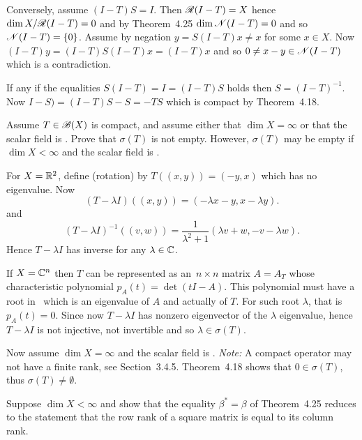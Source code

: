 \begin{enumerate}
\begin{itemize}
Conversely, assume \((I - T)S = I\).
Then \(\mathscr{R}(I - T) = X\) 
hence \(\dim X / \mathscr{R}(I - T) = 0\)
and by Theorem~4.25 \(\dim \mathscr{N}(I -T) = 0\) 
and so \(\mathscr{N}(I -T) = \{0\}\).
Assume by negation \(y = S(I - T)x \neq x\) for some \(x\in X\).
Now \((I - T)y = (I - T)S(I - T)x = (I - T)x\) and so 
\(0 \neq x - y \in \mathscr{N}(I - T)\) which is a contradiction.

If any if the equalities \(S(I - T) = I = (I - T)S\) holds
then \(S = (I - T)^{-1}\). 
Now \(I - S) = (I - T)S - S = -TS\) which is compact by Theorem~4.18.
\end{itemize}

\begin{excopy}
Assume \(T \in \mathscr{B}(X)\) is compact, and assume either that \(\dim X = \infty\)
or that the scalar
field is \C. Prove that \(\sigma(T)\) is not empty. However, \(\sigma(T)\)
 may be empty if \(\dim X < \infty\)
and the scalar field is \R.
\end{excopy}

For \(X = \mathbb{R}^2\), define (rotation) by \(T((x,y)) = (-y, x)\) which has
no eigenvalue. Now 
\begin{equation*}
(T - \lambda I)((x,y)) = (-\lambda x - y, x -\lambda y).
\end{equation*}
and
\begin{equation*}
(T - \lambda I)^{-1}((v,w)) 
  = \frac{1}{\lambda^2 + 1}(\lambda v + w, -v -\lambda w).
\end{equation*}
Hence \(T - \lambda I\) has inverse for any \(\lambda \in \mathbb{C}\).

If \(X = \mathbb{C}^n\) then $T$ can be represented 
as an~\(n\times n\) matrix \(A = A_T\)
whose characteristic polynomial \(p_A(t) = \det(tI - A)\).
This polynomial must have a root in \C\ which is an eigenvalue
of $A$ and actually of $T$. For such root \(\lambda\),
that is \(p_A(t) = 0\). Since now \(T -\lambda I\) 
has nonzero eigenvector of the \(\lambda\) eigenvalue,
hence \(T - \lambda I\) is not injective, not invertible
and so \(\lambda \in \sigma(T)\).

Now assume \(\dim X = \infty\) and the scalar field is \C.
\emph{Note:} A compact operator may not have a finite rank,
see \cite{Megginson1998} Section~3.4.5.
Theorem~4.18 shows that \(0 \in \sigma(T)\),
thus \(\sigma(T)\neq\emptyset\).


\begin{excopy}
Suppose \(\dim X < \infty\) and show that the equality \(\beta^* = \beta\)
 of Theorem~4.25 reduces to the
statement that the row rank of a square matrix is equal to its column rank.
\end{excopy}


\end{enumerate}
